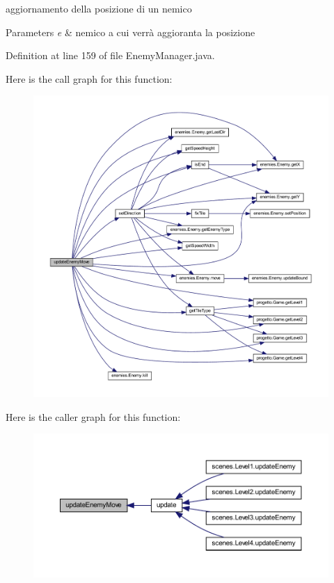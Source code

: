 aggiornamento della posizione di un nemico 


\begin{DoxyParams}{Parameters}
{\em e} & nemico a cui verrà aggioranta la posizione \\
\hline
\end{DoxyParams}


Definition at line 159 of file Enemy\+Manager.\+java.

Here is the call graph for this function\+:\nopagebreak
\begin{figure}[H]
\begin{center}
\leavevmode
\includegraphics[width=350pt]{classmanagers_1_1_enemy_manager_a8f172cfa5ade4d4f0a6b89cc6bfc4d12_cgraph}
\end{center}
\end{figure}
Here is the caller graph for this function\+:\nopagebreak
\begin{figure}[H]
\begin{center}
\leavevmode
\includegraphics[width=350pt]{classmanagers_1_1_enemy_manager_a8f172cfa5ade4d4f0a6b89cc6bfc4d12_icgraph}
\end{center}
\end{figure}


